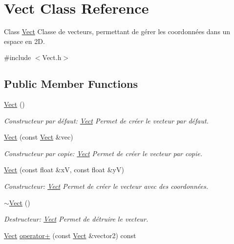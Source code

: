 \hypertarget{classVect}{}\section{Vect Class Reference}
\label{classVect}


Class \hyperlink{classVect}{Vect} Classe de vecteurs, permettant de gérer les coordonnées dans un espace en 2D.  




{\ttfamily \#include $<$Vect.\+h$>$}

\subsection*{Public Member Functions}
\begin{DoxyCompactItemize}
\item 
\hyperlink{classVect_a1c153510458899146850b79a7277630b}{Vect} ()
\begin{DoxyCompactList}\small\item\em Constructeur par défaut\+: \hyperlink{classVect}{Vect} Permet de créer le vecteur par défaut. \end{DoxyCompactList}\item 
\hyperlink{classVect_af8a503f3e10b3ec27582e47fbbf3c66f}{Vect} (const \hyperlink{classVect}{Vect} \&vec)
\begin{DoxyCompactList}\small\item\em Constructeur par copie\+: \hyperlink{classVect}{Vect} Permet de créer le vecteur par copie. \end{DoxyCompactList}\item 
\hyperlink{classVect_a12b53ecc7a5ba733c85bacc1c6deac28}{Vect} (const float \&xV, const float \&yV)
\begin{DoxyCompactList}\small\item\em Constructeur\+: \hyperlink{classVect}{Vect} Permet de créer le vecteur avec des coordonnées. \end{DoxyCompactList}\item 
\mbox{\label{classVect_a3df4e75343958eba8516d1cdc0077ecd}} 
\hyperlink{classVect_a3df4e75343958eba8516d1cdc0077ecd}{$\sim$\+Vect} ()
\begin{DoxyCompactList}\small\item\em Destructeur\+: \hyperlink{classVect}{Vect} Permet de détruire le vecteur. \end{DoxyCompactList}\item 
\hyperlink{classVect}{Vect} \hyperlink{classVect_a7b55d7a81e3a6770d03cbe50b9fcf1cf}{operator+} (const \hyperlink{classVect}{Vect} \&vector2) const

\end{DoxyCompactItemize}

